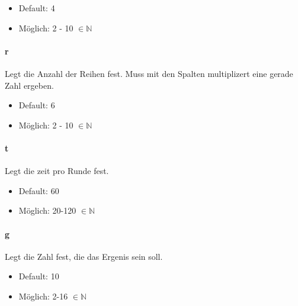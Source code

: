 \documentclass[
  paper=a4,
  ,captions=tableheading
]{scrartcl}
\providecommand{\tightlist}{%
  \setlength{\itemsep}{0pt}\setlength{\parskip}{0pt}}
\begin{document}
\begin{itemize}
\tightlist
\item
  Default: 4
\item
  Möglich: 2 - 10 \(\in \mathbb{N}\)
\end{itemize}

\hypertarget{r-1}{%
\paragraph{r}\label{r-1}}

Legt die Anzahl der Reihen fest. Muss mit den Spalten multiplizert eine
gerade Zahl ergeben.

\begin{itemize}
\tightlist
\item
  Default: 6
\item
  Möglich: 2 - 10 \(\in \mathbb{N}\)
\end{itemize}

\hypertarget{t-1}{%
\paragraph{t}\label{t-1}}

Legt die zeit pro Runde fest.

\begin{itemize}
\tightlist
\item
  Default: 60
\item
  Möglich: 20-120 \(\in \mathbb{N}\)
\end{itemize}

\hypertarget{g}{%
\paragraph{g}\label{g}}

Legt die Zahl fest, die das Ergenis sein soll.

\begin{itemize}
\tightlist
\item
  Default: 10
\item
  Möglich: 2-16 \(\in \mathbb{N}\)
\end{itemize}
\end{document}
